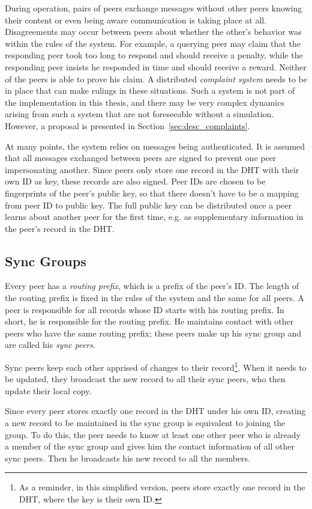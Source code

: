 During operation, pairs of peers exchange messages without other peers knowing
their content or even being aware communication is taking place at all.
Disagreements may occur between peers about whether the other's behavior was
within the rules of the system. For example, a querying peer may claim that the
responding peer took too long to respond and should receive a penalty, while the
responding peer insists he responded in time and should receive a reward.
Neither of the peers is able to prove his claim. A distributed \emph{complaint
system} needs to be in place that can make rulings in these situations. Such a
system is not part of the implementation in this thesis, and there may be very
complex dynamics arising from such a system that are not foreseeable without a
simulation. However, a proposal is presented in
Section~\ref{sec:desc_complaints}.

At many points, the system relies on messages being authenticated. It is assumed
that all messages exchanged between peers are signed to prevent one peer
impersonating another. Since peers only store one record in the \ac{DHT} with
their own ID as key, these records are also signed. Peer IDs are chosen to be
fingerprints of the peer's public key, so that there doesn't have to be a
mapping from peer ID to public key. The full public key can be distributed once
a peer learns about another peer for the first time, e.g. as supplementary
information in the peer's record in the DHT.

\subsection{Sync Groups}
\label{sec:desc_sync_groups}
Every peer has a \emph{routing prefix}, which is a prefix of the peer's ID. The
length of the routing prefix is fixed in the rules of the system and the same
for all peers. A peer is responsible for all records whose ID starts with his
routing prefix. In short, he is responsible for the routing prefix. He maintains
contact with other peers who have the same routing prefix; these peers make up
his sync group and are called his \emph{sync peers}.

Sync peers keep each other apprised of changes to their record\footnote{As a
reminder, in this simplified version, peers store exactly one record in the
\ac{DHT}, where the key is their own ID.}. When it needs to be updated, they
broadcast the new record to all their sync peers, who then update their local
copy.

Since every peer stores exactly one record in the \ac{DHT} under his own ID,
creating a new record to be maintained in the sync group is equivalent to
joining the group. To do this, the peer needs to know at least one other peer
who is already a member of the sync group and gives him the contact information
of all other sync peers. Then he broadcasts his new record to all the members.

